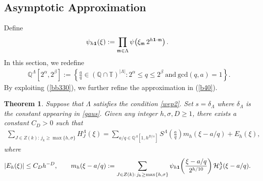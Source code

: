 \documentclass[10pt,a4paper]{amsart}
\newtheorem{theorem}{Theorem}\numberwithin{theorem}{section}
\numberwithin{equation}{section}
\begin{document}
\subsection{Asymptotic Approximation}
Define
\[
\psi_{h{\bf 1}}(\xi):= \prod_{\mathfrak{m}\in \Lambda}
\psi\!\left(  \xi_{\mathfrak{m}}\, 2^{h {\bf 1}\cdot \mathfrak{m}}   \right).
\] In this section, we redefine  	\begin{align*} 
	\ \ \mathbb{Q}^{\Lambda}[2^{\alpha},2^{\beta}]:=  \left\{\frac{a}{q}\in   (\mathbb{Q}\cap \mathbb{T})^{|\Lambda|}: 2^{\alpha}\le q \le 2^{\beta}\ \text{and}\  \text{gcd}(q,a)=1\right\}.
\end{align*}
By exploiting (\ref{bb330}), we further refine the approximation in (\ref{b40}).


\begin{theorem}\label{IW3}  
Suppose that $\Lambda$ satisfies the condition   \eqref{wep2}. Set $s=\delta_{\Lambda}$ where $\delta_{\Lambda}$ is the constant appearing in \eqref{gaus}.
Given any integer $h,\sigma,D \ge 1$,  there exists a constant $C_D>0$ such that
\begin{align}\label{IW5}
\sum_{J\in Z(k):\, j_k\ge \max\{h,\sigma\}} H^{\Lambda}_{J}(\xi)
= \sum_{a/q\in \mathbb{Q}^{\Lambda}[1,h^{D/s}]} S^{\Lambda}\!\left(\frac{a}{q}\right) m_{h}( \xi -a/q)  +E_{h}(\xi),
\end{align}
where
\begin{align*}
\left|E_{h}(\xi)\right| \leq C_{D} h^{-D},
\qquad 
m_{h}( \xi-a/q )
:=  \sum_{J \in Z(k):\, j_k\ge \max\{h,\sigma\}}  
\psi_{h{\bf 1}}\!\left(\frac{\xi-a/q}{2^{h/10}}\right)\mathcal{H}^\Lambda_{J}(\xi-a/q).
\end{align*}
\end{theorem}
\end{document}
